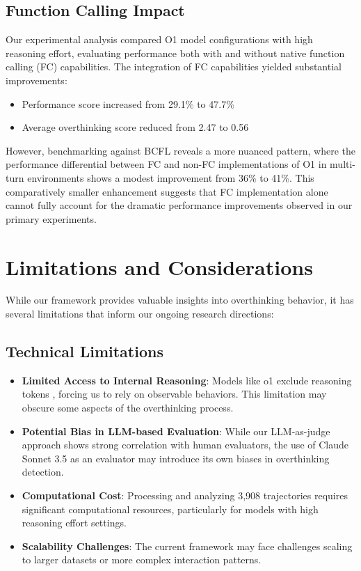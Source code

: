 \subsection{Function Calling Impact}
Our experimental analysis compared O1 model configurations with high reasoning effort, evaluating performance both with and without native function calling (FC) capabilities. The integration of FC capabilities yielded substantial improvements:
\begin{itemize}
    \item Performance score increased from 29.1\% to 47.7\%
    \item Average overthinking score reduced from 2.47 to 0.56
\end{itemize}

However, benchmarking against BCFL \cite{berkeley-function-calling-leaderboard} reveals a more nuanced pattern, where the performance differential between FC and non-FC implementations of O1 in multi-turn environments shows a modest improvement from 36\% to 41\%. This comparatively smaller enhancement suggests that FC implementation alone cannot fully account for the dramatic performance improvements observed in our primary experiments.

\section{Limitations and Considerations}
\label{sec:limitations}

While our framework provides valuable insights into overthinking behavior, it has several limitations that inform our ongoing research directions:

\subsection{Technical Limitations}
\begin{itemize}
    \item \textbf{Limited Access to Internal Reasoning}: Models like o1 exclude reasoning tokens \cite{openai_learning_to_reason_2024}, forcing us to rely on observable behaviors. This limitation may obscure some aspects of the overthinking process.
    
    \item \textbf{Potential Bias in LLM-based Evaluation}: While our LLM-as-judge approach shows strong correlation with human evaluators, the use of Claude Sonnet 3.5 as an evaluator may introduce its own biases in overthinking detection.
    
    \item \textbf{Computational Cost}: Processing and analyzing 3,908 trajectories requires significant computational resources, particularly for models with high reasoning effort settings.
    
    \item \textbf{Scalability Challenges}: The current framework may face challenges scaling to larger datasets or more complex interaction patterns.
\end{itemize}

